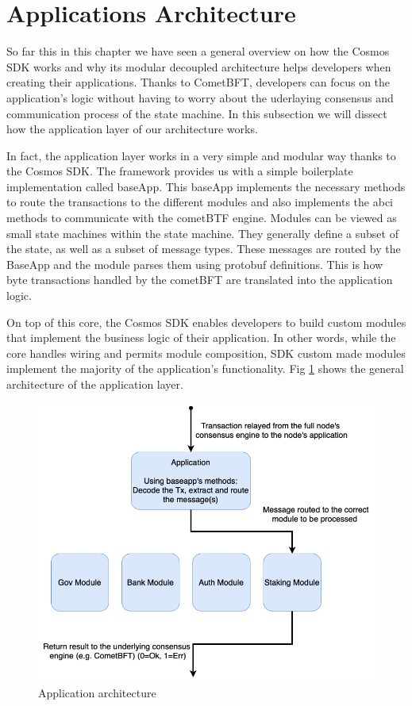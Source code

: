 \section{Applications Architecture}
\label{ch:applicatoins-architecture}

So far this in this chapter we have seen a general overview on how the Cosmos SDK works and why its modular decoupled architecture helps developers when creating their applications. Thanks to CometBFT, developers can focus on the application's logic without having to worry about the uderlaying consensus and communication process of the state machine. In this subsection we will dissect how the application layer of our architecture works.

In fact, the application layer works in a very simple and modular way thanks to the Cosmos SDK. The framework provides us with a simple boilerplate implementation called baseApp. This baseApp implements the necessary methods to route the transactions to the different modules and also implements the \gls{abci} methods to communicate with the cometBTF engine. Modules can be viewed as small state machines within the state machine. They generally define a subset of the state, as well as a subset of message types. These messages are routed by the BaseApp and the module parses them using protobuf definitions. This is how byte transactions handled by the cometBFT are translated into the application logic.

On top of this core, the Cosmos SDK enables developers to build custom modules that implement the business logic of their application. In other words, while the core handles wiring and permits module composition, SDK custom made modules implement the majority of the application's functionality. Fig \ref{fig:application-modules} shows the general architecture of the application layer.

\begin{figure}[H]
    \centering
    \includegraphics[width=\textwidth]{figures/prueba.png}
    \caption{Application architecture}
    \label{fig:application-modules}
\end{figure}
